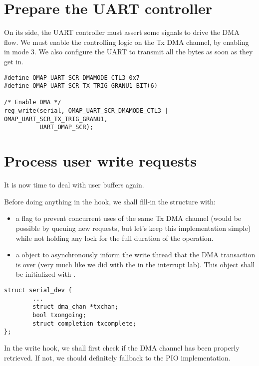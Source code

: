 \section{Prepare the UART controller}

On its side, the UART controller must assert some signals to drive the DMA
flow. We must enable the controlling logic on the Tx DMA channel, by enabling
 in mode 3. We also configure the UART to transmit all the bytes
as soon as they get in.

\begin{verbatim}
#define OMAP_UART_SCR_DMAMODE_CTL3 0x7
#define OMAP_UART_SCR_TX_TRIG_GRANU1 BIT(6)

/* Enable DMA */
reg_write(serial, OMAP_UART_SCR_DMAMODE_CTL3 | OMAP_UART_SCR_TX_TRIG_GRANU1,
          UART_OMAP_SCR);
\end{verbatim}

\section{Process user write requests}

It is now time to deal with user buffers again.

Before doing anything in the  hook, we shall fill-in the
 structure with:
\begin{itemize}
\item a  flag to prevent concurrent uses of the same
  Tx DMA channel (would be possible by queuing new requests, but let's keep this
  implementation simple) while not holding any lock for the full duration of
  the operation.
\item a  object to asynchronously inform the
  write thread that the DMA transaction is over (very much like we did with the
   in the interrupt lab). This object shall be initialized with
  .
\end{itemize}

\begin{verbatim}
struct serial_dev {
        ...
        struct dma_chan *txchan;
        bool txongoing;
        struct completion txcomplete;
};
\end{verbatim}

In the write hook, we shall first check if the DMA channel has been
properly retrieved. If not, we should definitely fallback to the PIO
implementation.

